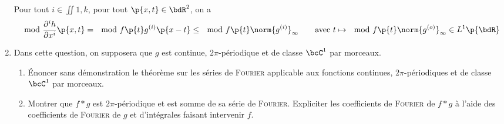 \documentclass[a4paper,french,bookmarks]{article}
\begin{document}
\begin{enumerate}
{\begin{enumerate}
                \itt Pour tout $i \in \iint{1, k}$, pour tout $\p{x, t} \in \bdR^2$, on a 
                \[ \mod{\dfrac{\partial^i h}{\partial x^i}\p{x, t}} = \mod{f\p{t}g^{(i)}\p{x - t}} \leq \mod{f\p{t}}\norm{g^{(i)}}_\infty \qquad\text{avec} \ t \mapsto \mod{f\p{t}}\norm{g^{(o)}}_\infty \in L^1\p{\bdR}\]
            \end{enumerate}
        }
        \nobefore\yesafter
        \yesbefore
        
        \item Dans cette question, on supposera que $g$ est continue, $2\pi$-périodique et de classe $\bcC^1$ par morceaux.
        
        \begin{enumerate}
            \item Énoncer sans démonstration le théorème sur les séries de \textsc{Fourier} applicable aux fonctions continues, $2\pi$-périodiques et de classe $\bcC^1$ par morceaux.
            
            
            \item Montrer que $f \ast g$ est $2\pi$-périodique et est somme de sa série de \textsc{Fourier}. Expliciter les coefficients de \textsc{Fourier} de $f \ast g$ à l'aide des coefficients de \textsc{Fourier} de $g$ et d'intégrales faisant intervenir $f$.
            

\end{enumerate}
\end{enumerate}
\end{document}
